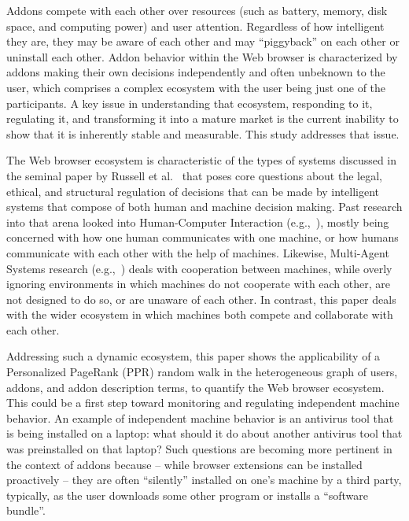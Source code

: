 \documentclass[10pt,letterpaper]{article}
\begin{document}
Addons compete with each other over resources (such as battery, memory, disk space, and computing power) and user attention. Regardless of how intelligent they are, they may be aware of each other and may ``piggyback'' on each other or uninstall each other. Addon behavior within the Web browser is characterized by addons making their own decisions independently and often unbeknown to the user, which comprises a complex ecosystem with the user being just one of the participants. A key issue in understanding that ecosystem, responding to it, regulating it, and transforming it into a mature market is the current inability to show that it is inherently stable and measurable. This study addresses that issue. 

The Web browser ecosystem is characteristic of the types of systems discussed in the seminal paper by Russell et al.~\cite{russell2016research} that poses core questions about the legal, ethical, and structural regulation of decisions that can be made by intelligent systems that compose of both human and machine decision making. Past research into that arena looked into Human-Computer Interaction (e.g.,~\cite{dix2009human}), mostly being concerned with how one human communicates with one machine, or how humans communicate with each other with the help of machines. Likewise, Multi-Agent Systems research (e.g.,~\cite{olfati2007consensus}) deals with cooperation between machines, while overly ignoring environments in which machines do not cooperate with each other, are not designed to do so, or are unaware of each other. In contrast, this paper deals with the wider ecosystem in which machines both compete and collaborate with each other. 

Addressing such a dynamic ecosystem, this paper shows the applicability of a Personalized PageRank (PPR) random walk in the heterogeneous graph of users, addons, and addon description terms, to quantify the Web browser ecosystem. This could be a first step toward monitoring and regulating independent machine behavior. An example of independent machine behavior is an antivirus tool that is being installed on a laptop: what should it do about another antivirus tool that was preinstalled on that laptop? Such questions are becoming more pertinent in the context of addons because -- while browser extensions can be installed proactively -- they are often ``silently'' installed on one’s machine by a third party, typically, as the user downloads some other program or installs a ``software bundle''. 
\end{document}
